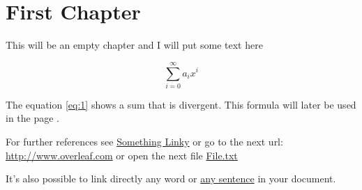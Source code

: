 \documentclass{book}
\begin{document}
	
	\tableofcontents
	
	\chapter{First Chapter}
	
	This will be an empty chapter and I will put some text here
	
	\begin{equation}
		\label{eq:1}
		\sum_{i=0}^{\infty} a_i x^i
	\end{equation}
	
	The equation \ref{eq:1} shows a sum that is divergent. This formula 
	will later be used in the page \pageref{second}.
	
	For further references see \href{http://www.overleaf.com}{Something 
		Linky} or go to the next url: \url{http://www.overleaf.com} or open 
	the next file \href{run:./file.txt}{File.txt}
	
	It's also possible to link directly any word or 
	\hyperlink{thesentence}{any sentence} in your document.
	
\end{document}
